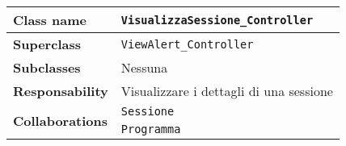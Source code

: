 \begin{table}[h!]
	\begin{tabular}{|l|l|}
		\hline 
		\textbf{Class name} & \texttt{VisualizzaSessione\_Controller}
		\\ \hline
		\textbf{Superclass} & \texttt{ViewAlert\_Controller}
		\\ \hline
		\multirow{1}{*}{\textbf{Subclasses}} & Nessuna
		\\ \hline
		\textbf{Responsability} & Visualizzare i dettagli di una sessione
		\\ \hline
		\multirow{2}{*}{\textbf{Collaborations}} & \texttt{Sessione}\\
		& \texttt{Programma}
		\\ \hline
	\end{tabular}
\end{table} 